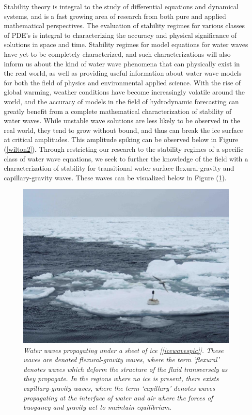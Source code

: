 \documentclass{article}
\begin{document}
Stability theory is integral to the study of differential equations and dynamical systems, and is a fast growing area of research from both pure and applied mathematical perspectives. The evaluation of stability regimes for various classes of PDE’s is integral to characterizing the accuracy and physical significance of solutions in space and time. Stability regimes for model equations for water waves have yet to be completely characterized, and such characterizations will also inform us about the kind of water wave phenomena that can physically exist in the real world, as well as providing useful information about water wave models for both the field of physics and environmental applied science. With the rise of global warming, weather conditions have become increasingly volatile around the world, and the accuracy of models in the field of hydrodynamic forecasting can greatly benefit from a complete mathematical characterization of stability of water waves. While unstable wave solutions are less likely to be observed in the real world, they tend to grow without bound, and thus can break the ice surface at critical amplitudes. This amplitude spiking can be observed below in Figure (\ref{wilton2}). Through restricting our research to the stability regimes of a specific class of water wave equations, we seek to further the knowledge of the field with a characterization of stability for transitional water surface flexural-gravity and capillary-gravity waves. These waves can be visualized below in Figure (\ref{icewaves}). \\

\begin{figure}[hbt!] 
\centering
\includegraphics[scale = .4]{icewaves.jpg}
\caption{ \emph{Water waves propagating under a sheet of ice [\ref{icewavespic}]. These waves are denoted flexural-gravity waves, where the term `flexural' denotes waves which deform the structure of the fluid transversely as they propagate. In the regions where no ice is present, there exists capillary-gravity waves, where the term `capillary' denotes waves propagating at the interface of water and air where the forces of buoyancy and gravity act to maintain equilibrium.
 }}\label{icewaves}
\end{figure}
\end{document}
